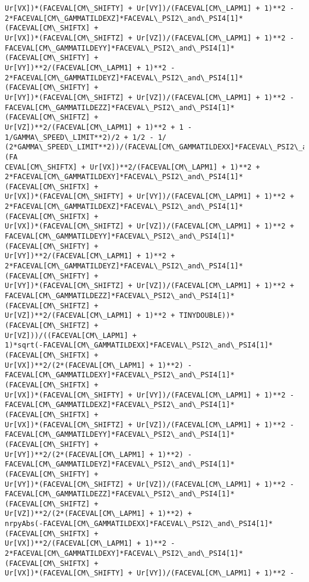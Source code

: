 \documentclass[landscape,letterpaper,10pt,english]{article}
\begin{document}
\begin{Verbatim}[commandchars=\\\{\}]
Ur[VX])*(FACEVAL[CM\_SHIFTY] + Ur[VY])/(FACEVAL[CM\_LAPM1] + 1)**2 -
2*FACEVAL[CM\_GAMMATILDEXZ]*FACEVAL\_PSI2\_and\_PSI4[1]*(FACEVAL[CM\_SHIFTX] +
Ur[VX])*(FACEVAL[CM\_SHIFTZ] + Ur[VZ])/(FACEVAL[CM\_LAPM1] + 1)**2 -
FACEVAL[CM\_GAMMATILDEYY]*FACEVAL\_PSI2\_and\_PSI4[1]*(FACEVAL[CM\_SHIFTY] +
Ur[VY])**2/(FACEVAL[CM\_LAPM1] + 1)**2 -
2*FACEVAL[CM\_GAMMATILDEYZ]*FACEVAL\_PSI2\_and\_PSI4[1]*(FACEVAL[CM\_SHIFTY] +
Ur[VY])*(FACEVAL[CM\_SHIFTZ] + Ur[VZ])/(FACEVAL[CM\_LAPM1] + 1)**2 -
FACEVAL[CM\_GAMMATILDEZZ]*FACEVAL\_PSI2\_and\_PSI4[1]*(FACEVAL[CM\_SHIFTZ] +
Ur[VZ])**2/(FACEVAL[CM\_LAPM1] + 1)**2 + 1 - 1/GAMMA\_SPEED\_LIMIT**2)/2 + 1/2 - 1/
(2*GAMMA\_SPEED\_LIMIT**2))/(FACEVAL[CM\_GAMMATILDEXX]*FACEVAL\_PSI2\_and\_PSI4[1]*(FA
CEVAL[CM\_SHIFTX] + Ur[VX])**2/(FACEVAL[CM\_LAPM1] + 1)**2 +
2*FACEVAL[CM\_GAMMATILDEXY]*FACEVAL\_PSI2\_and\_PSI4[1]*(FACEVAL[CM\_SHIFTX] +
Ur[VX])*(FACEVAL[CM\_SHIFTY] + Ur[VY])/(FACEVAL[CM\_LAPM1] + 1)**2 +
2*FACEVAL[CM\_GAMMATILDEXZ]*FACEVAL\_PSI2\_and\_PSI4[1]*(FACEVAL[CM\_SHIFTX] +
Ur[VX])*(FACEVAL[CM\_SHIFTZ] + Ur[VZ])/(FACEVAL[CM\_LAPM1] + 1)**2 +
FACEVAL[CM\_GAMMATILDEYY]*FACEVAL\_PSI2\_and\_PSI4[1]*(FACEVAL[CM\_SHIFTY] +
Ur[VY])**2/(FACEVAL[CM\_LAPM1] + 1)**2 +
2*FACEVAL[CM\_GAMMATILDEYZ]*FACEVAL\_PSI2\_and\_PSI4[1]*(FACEVAL[CM\_SHIFTY] +
Ur[VY])*(FACEVAL[CM\_SHIFTZ] + Ur[VZ])/(FACEVAL[CM\_LAPM1] + 1)**2 +
FACEVAL[CM\_GAMMATILDEZZ]*FACEVAL\_PSI2\_and\_PSI4[1]*(FACEVAL[CM\_SHIFTZ] +
Ur[VZ])**2/(FACEVAL[CM\_LAPM1] + 1)**2 + TINYDOUBLE))*(FACEVAL[CM\_SHIFTZ] +
Ur[VZ]))/((FACEVAL[CM\_LAPM1] +
1)*sqrt(-FACEVAL[CM\_GAMMATILDEXX]*FACEVAL\_PSI2\_and\_PSI4[1]*(FACEVAL[CM\_SHIFTX] +
Ur[VX])**2/(2*(FACEVAL[CM\_LAPM1] + 1)**2) -
FACEVAL[CM\_GAMMATILDEXY]*FACEVAL\_PSI2\_and\_PSI4[1]*(FACEVAL[CM\_SHIFTX] +
Ur[VX])*(FACEVAL[CM\_SHIFTY] + Ur[VY])/(FACEVAL[CM\_LAPM1] + 1)**2 -
FACEVAL[CM\_GAMMATILDEXZ]*FACEVAL\_PSI2\_and\_PSI4[1]*(FACEVAL[CM\_SHIFTX] +
Ur[VX])*(FACEVAL[CM\_SHIFTZ] + Ur[VZ])/(FACEVAL[CM\_LAPM1] + 1)**2 -
FACEVAL[CM\_GAMMATILDEYY]*FACEVAL\_PSI2\_and\_PSI4[1]*(FACEVAL[CM\_SHIFTY] +
Ur[VY])**2/(2*(FACEVAL[CM\_LAPM1] + 1)**2) -
FACEVAL[CM\_GAMMATILDEYZ]*FACEVAL\_PSI2\_and\_PSI4[1]*(FACEVAL[CM\_SHIFTY] +
Ur[VY])*(FACEVAL[CM\_SHIFTZ] + Ur[VZ])/(FACEVAL[CM\_LAPM1] + 1)**2 -
FACEVAL[CM\_GAMMATILDEZZ]*FACEVAL\_PSI2\_and\_PSI4[1]*(FACEVAL[CM\_SHIFTZ] +
Ur[VZ])**2/(2*(FACEVAL[CM\_LAPM1] + 1)**2) +
nrpyAbs(-FACEVAL[CM\_GAMMATILDEXX]*FACEVAL\_PSI2\_and\_PSI4[1]*(FACEVAL[CM\_SHIFTX] +
Ur[VX])**2/(FACEVAL[CM\_LAPM1] + 1)**2 -
2*FACEVAL[CM\_GAMMATILDEXY]*FACEVAL\_PSI2\_and\_PSI4[1]*(FACEVAL[CM\_SHIFTX] +
Ur[VX])*(FACEVAL[CM\_SHIFTY] + Ur[VY])/(FACEVAL[CM\_LAPM1] + 1)**2 -

\end{Verbatim}
\end{document}
